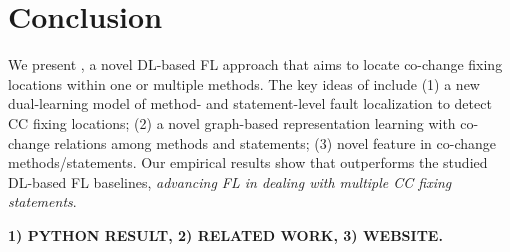 \section{Conclusion}

We present {\tool}, a novel DL-based FL approach that aims to locate
co-change fixing locations within one or multiple methods. The key
ideas of {\tool} include (1) a new dual-learning model of method- and
statement-level fault localization to detect CC fixing locations; (2)
a novel graph-based representation learning with co-change relations
among methods and statements; (3) novel feature in co-change
methods/statements. Our empirical results show that {\tool}
outperforms the studied DL-based FL baselines, {\em advancing FL in
  dealing with multiple CC fixing statements}.

{\bf 1) PYTHON RESULT, 2) RELATED WORK, 3) WEBSITE.}

